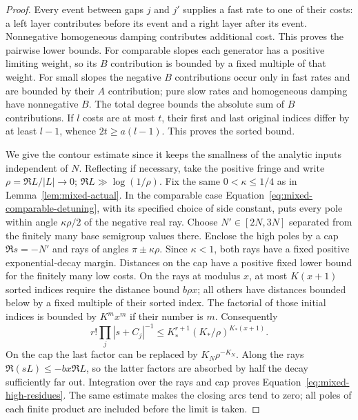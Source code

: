 \begin{proof}
Every event between gaps $j$ and $j'$ supplies a fast rate to one of
their costs: a left layer contributes before its event and a right
layer after its event. Nonnegative homogeneous damping contributes
additional cost. This proves the pairwise lower bounds. For
comparable slopes each generator has a positive limiting weight,
so its $B$ contribution is bounded by a fixed multiple of that
weight. For small slopes the negative $B$ contributions occur only
in fast rates and are bounded by their $A$ contribution; pure slow
rates and homogeneous damping have nonnegative $B$. The total
degree bounds the absolute sum of $B$ contributions. If $l$ costs
are at most $t$, their first and last original indices differ by
at least $l-1$, whence $2t\geq a(l-1)$. This proves the sorted bound.

We give the contour estimate since it keeps the smallness of the
analytic inputs independent of $N$. Reflecting if necessary, take
the positive fringe and write $\rho=\Re L/|L|\to0$;
$\Re L\gg\log(1/\rho)$. Fix the same $0<\kappa\leq1/4$ as in
Lemma~\ref{lem:mixed-actual}. In the comparable case
Equation~\eqref{eq:mixed-comparable-detuning}, with its specified
choice of side constant, puts every pole within angle
$\kappa\rho/2$ of the negative real ray. Choose
$N'\in[2N,3N]$ separated from the finitely many base semigroup
values there. Enclose the high poles by a cap $\Re s=-N'$ and
rays of angles $\pi\pm\kappa\rho$. Since $\kappa<1$, both rays
have a fixed positive exponential-decay margin. Distances on the cap have a positive
fixed lower bound for the finitely many low costs. On the rays
at modulus $x$, at most $K(x+1)$ sorted indices require the
distance bound $b\rho x$; all others have distances bounded below
by a fixed multiple of their sorted index. The factorial of those
initial indices is bounded by $K^m x^m$ if their number is $m$.
Consequently
\[
 r!\prod_j|s+C_j|^{-1}
 \leq K_*^{r+1}(K_*/\rho)^{K_*(x+1)}.
\]
On the cap the last factor can be replaced by $K_N\rho^{-K_N}$.
Along the rays $\Re(sL)\leq-bx\Re L$, so the latter factors are
absorbed by half the decay sufficiently far out. Integration over
the rays and cap proves Equation~\eqref{eq:mixed-high-residues}.
The same estimate makes the closing arcs tend to zero; all poles
of each finite product are included before the limit is taken.


\end{proof}
